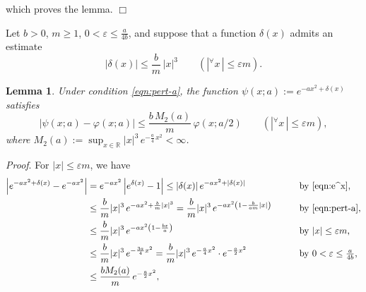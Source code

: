 \documentclass[a4paper,12pt]{article}
\theoremstyle{plain}
\newtheorem{lemma}[theorem]{Lemma}
\def\R{\mathbb{R}}
\def\ve{\varepsilon}
\def\ds{\displaystyle}
\begin{document}
which proves the lemma. \hfill $\Box$ \par\medskip
Let $b >0$, $m \ge 1$, $0 < \ve \le \frac{a}{4 b}$, and 
suppose that a function $\delta (x)$ admits an estimate  
\begin{equation} \label{eqn:pert-a}
| \delta( x ) | \le \frac{b}{m} \, |x|^3 \qquad 
(|{}^{\forall}x \, | \le \ve m).  
\end{equation}
\begin{lemma} \label{lem:pert}
Under condition \eqref{eqn:pert-a}, the function $\psi(x; a) 
:= e^{- a x^2 + \delta(x)}$ satisfies  
\begin{equation} \label{eqn:pert-r}
| \psi(x; a) - \varphi(x; a) | \le 
\frac{b \, M_2(a)}{m} \, \varphi(x; a/2 ) 
\qquad (|{}^{\forall} x \,| \le \ve m),  
\end{equation}
where $M_2(a) := \ds \sup_{x \in \R} |x|^3 \, 
e^{- \frac{a}{4} \, x^2} < \infty$. 
\end{lemma}
{\it Proof}. 
For $|x| \le \ve m$, we have 
\begin{alignat*}{2}
\left| e^{- a x^2 + \delta(x) } - e^{-a x^2} \right| 
& = e^{- a x^2} \left| e^{\delta(x)} -1 \right| 
\le | \delta(x) | \, e^{- a x^2 + | \delta(x) |} 
\qquad & & \mbox{by \eqref{eqn:e^x},} \\
& \le \frac{b}{m} |x|^3 \, e^{-a x^2 + \frac{b}{m} |x|^3 }  
= \frac{b}{m} |x|^3 \, e^{-a x^2 
\left( 1-\frac{b}{a m} |x| \right) } 
\qquad & & \mbox{by \eqref{eqn:pert-a},} \\ 
& \le \frac{b}{m} |x|^3 \, 
e^{-a x^2 \left( 1-\frac{b \ve}{a} \right) } 
\qquad & & \mbox{by $|x| \le \ve m$,} \\
& \le \frac{b}{m} |x|^3 \, e^{-\frac{3 a}{4} x^2 } 
= \frac{b}{m} |x|^3 \, e^{-\frac{a}{4} x^2 } \cdot 
e^{-\frac{a}{2} x^2 } 
\qquad & & \mbox{by $0 < \ve \le \frac{ a }{4 b }$,} \\
& \le \frac{b M_2(a)}{m} \, e^{-\frac{a}{2} x^2 },  
\end{alignat*}
\end{document}
